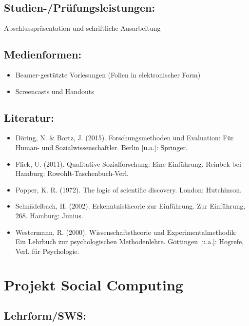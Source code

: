 \section{Studien-/Prüfungsleistungen:}\label{studien-pruxfcfungsleistungen-21}

Abschlusspräsentation und schriftliche Ausarbeitung

\section{Medienformen:}\label{medienformen-21}

\begin{itemize}
\tightlist
\item
  Beamer-gestützte Vorlesungen (Folien in elektronischer Form)
\item
  Screencasts und Handouts
\end{itemize}

\section{Literatur:}\label{literatur-21}

\begin{itemize}
\tightlist
\item
  Döring, N. \& Bortz, J. (2015). Forschungsmethoden und Evaluation: Für
  Human- und Sozialwissenschaftler. Berlin {[}u.a.{]}: Springer.
\item
  Flick, U. (2011). Qualitative Sozialforschung: Eine Einführung.
  Reinbek bei Hamburg: Rowohlt-Taschenbuch-Verl.
\item
  Popper, K. R. (1972). The logic of scientific discovery. London:
  Hutchinson.
\item
  Schnädelbach, H. (2002). Erkenntnistheorie zur Einführung. Zur
  Einführung, 268. Hamburg: Junius.
\item
  Westermann, R. (2000). Wissenschaftstheorie und Experimentalmethodik:
  Ein Lehrbuch zur psychologischen Methodenlehre. Göttingen {[}u.a.{]}:
  Hogrefe, Verl. für Psychologie.
\end{itemize}

\chapter{Projekt Social Computing}\label{projekt-social-computing}

\section{Lehrform/SWS:}\label{lehrformsws-22}

